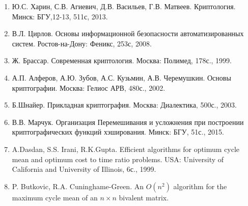 \documentclass[a4paper,12pt]{report}
\theoremstyle{plain} %
\theoremstyle{definition}
\theoremstyle{remark}
\begin{document}
\begin{large}
\begin{enumerate}
\item Ю.С. Харин, С.В. Агиевич, Д.В. Васильев, Г.В. Матвеев. Криптология.  Минск: БГУ,12-13, 511с, 2013.
\item В.Л. Цирлов. Основы информационной безопасности автоматизированных систем. Ростов-на-Дону: Феникс, 253с, 2008.
\item Ж. Брассар. Современная криптология. Москва: Полимед, 178с., 1999.
\item А.П. Алферов, А.Ю. Зубов, А.С. Кузьмин, А.В. Черемушкин. Основы криптографии. Москва: Гелиос АРВ, 480с., 2002.
\item Б.Шнайер. Прикладная криптография. Москва: Диалектика, 500с., 2003.
\item В.В. Марчук. Организация Перемешивания и усложнения при построении криптографических функций хэширования. Минск: БГУ, 51с., 2015.
\item A.Dasdan, S.S. Irani, R.K.Gupta. Efficient algorithms for optimum cycle mean and optimum cost to time ratio problems. USA: University of California and University of Illinois, 6с., 1999.
\item P. Butkovic, R.A. Cuninghame-Green. An $O(n^2)$ algorithm for the maximum cycle mean of an $n \times n$ bivalent matrix. 
\end{enumerate}
\end{large}
\end{document}
